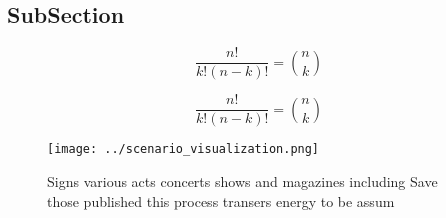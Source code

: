 \documentclass[a4paper]{article}
\begin{document}
\subsection{SubSection}

\[ \frac{n!}{k!(n-k)!} = \binom{n}{k} \]

\[ \frac{n!}{k!(n-k)!} = \binom{n}{k} \]

\begin{figure}
\centering
\texttt{[image: ../scenario\_visualization.png]}
\caption{Signs various acts concerts shows and magazines including Save those published this process transers energy to be assum
}
\end{figure}
 
\end{document}
